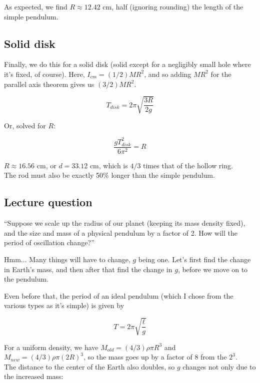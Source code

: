 As expected, we find $R \approx 12.42$ cm, half (ignoring rounding) the length of the simple pendulum. 

\subsection{Solid disk}

Finally, we do this for a solid disk (solid except for a negligibly small hole where it's fixed, of course). Here, $I_{cm} = (1/2) M R^2$, and so adding $M R ^2$ for the parallel axis theorem gives us $(3/2) M R^2$.

\begin{equation}
T_{disk} = 2 \pi \sqrt{\frac{3R}{2g}}
\end{equation}

Or, solved for $R$:

\begin{equation}
\frac{g T_{disk}^2}{6 \pi^2} = R
\end{equation}

$R \approx 16.56$ cm, or $d = 33.12$ cm, which is $4/3$ times that of the hollow ring.\\
The rod must also be exactly 50\% longer than the simple pendulum.

\subsection{Lecture question}

``Suppose we scale up the radius of our planet (keeping its mass density fixed), and the size and mass of a physical pendulum by a factor of 2. How will the period of oscillation change?''

Hmm... Many things will have to change, $g$ being one. Let's first find the change in Earth's mass, and then after that find the change in $g$, before we move on to the pendulum.

Even before that, the period of an ideal pendulum (which I chose from the various types as it's simple) is given by

\begin{equation}
T = 2 \pi \sqrt{\frac{\ell}{g}}
\end{equation}

For a uniform density, we have $M_{old} = (4/3) \rho \pi R^3$ and $M_{new} = (4/3) \rho \pi (2R)^3$, so the mass goes up by a factor of 8 from the $2^3$.\\
The distance to the center of the Earth also doubles, so $g$ changes not only due to the increased mass:

